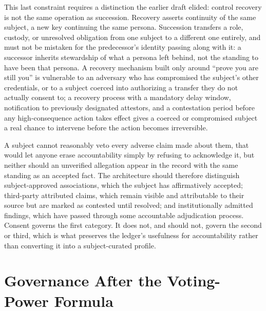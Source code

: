 This last constraint requires a distinction the earlier draft elided: control recovery is not the same operation as succession. Recovery asserts continuity of the same subject, a new key continuing the same persona. Succession transfers a role, custody, or unresolved obligation from one subject to a different one entirely, and must not be mistaken for the predecessor's identity passing along with it: a successor inherits stewardship of what a persona left behind, not the standing to have been that persona. A recovery mechanism built only around ``prove you are still you'' is vulnerable to an adversary who has compromised the subject's other credentials, or to a subject coerced into authorizing a transfer they do not actually consent to; a recovery process with a mandatory delay window, notification to previously designated attestors, and a contestation period before any high-consequence action takes effect gives a coerced or compromised subject a real chance to intervene before the action becomes irreversible.

A subject cannot reasonably veto every adverse claim made about them, that would let anyone erase accountability simply by refusing to acknowledge it, but neither should an unverified allegation appear in the record with the same standing as an accepted fact. The architecture should therefore distinguish subject-approved associations, which the subject has affirmatively accepted; third-party attributed claims, which remain visible and attributable to their source but are marked as contested until resolved; and institutionally admitted findings, which have passed through some accountable adjudication process. Consent governs the first category. It does not, and should not, govern the second or third, which is what preserves the ledger's usefulness for accountability rather than converting it into a subject-curated profile.

\section{Governance After the Voting-Power Formula}

